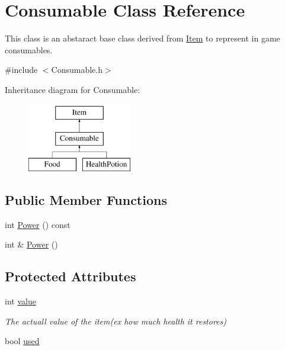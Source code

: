 \hypertarget{classConsumable}{\section{Consumable Class Reference}
\label{classConsumable}
}


This class is an abstaract base class derived from \hyperlink{classItem}{Item} to represent in game consumables.  




{\ttfamily \#include $<$Consumable.\-h$>$}

Inheritance diagram for Consumable\-:\begin{figure}[H]
\begin{center}
\leavevmode
\includegraphics[height=3.000000cm]{classConsumable}
\end{center}
\end{figure}
\subsection*{Public Member Functions}
\begin{DoxyCompactItemize}
\item 
int \hyperlink{classConsumable_a5cc8fd73435230310fc270f47f445beb}{Power} () const 
\item 
int \& \hyperlink{classConsumable_a3ad6ae447a841241c122c616613962e5}{Power} ()
\end{DoxyCompactItemize}
\subsection*{Protected Attributes}
\begin{DoxyCompactItemize}
\item 
int \hyperlink{classConsumable_a492024e0b8fd5b6c6e944116cbff3e32}{value}
\begin{DoxyCompactList}\small\item\em The actuall value of the item(ex how much health it restores) \end{DoxyCompactList}\item 
bool \hyperlink{classConsumable_a261f0f34c301027337ffe6bf32bf0200}{used}
\end{DoxyCompactItemize}
